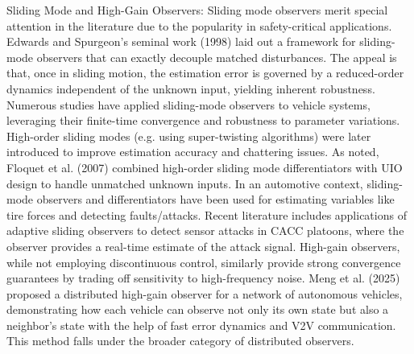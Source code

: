 Sliding Mode and High-Gain Observers: Sliding mode observers merit special attention in the literature due to the popularity in safety-critical applications. Edwards and Spurgeon’s seminal work (1998) laid out a framework for sliding-mode observers that can exactly decouple matched disturbances. The appeal is that, once in sliding motion, the estimation error is governed by a reduced-order dynamics independent of the unknown input, yielding inherent robustness. Numerous studies have applied sliding-mode observers to vehicle systems, leveraging their finite-time convergence and robustness to parameter variations. High-order sliding modes (e.g. using super-twisting algorithms) were later introduced to improve estimation accuracy and chattering issues. As noted, Floquet et al. (2007) combined high-order sliding mode differentiators with UIO design to handle unmatched unknown inputs. In an automotive context, sliding-mode observers and differentiators have been used for estimating variables like tire forces and detecting faults/attacks. Recent literature includes applications of adaptive sliding observers to detect sensor attacks in CACC platoons, where the observer provides a real-time estimate of the attack signal. High-gain observers, while not employing discontinuous control, similarly provide strong convergence guarantees by trading off sensitivity to high-frequency noise. Meng et al. (2025) proposed a distributed high-gain observer for a network of autonomous vehicles, demonstrating how each vehicle can observe not only its own state but also a neighbor’s state with the help of fast error dynamics and V2V communication. This method falls under the broader category of distributed observers.

